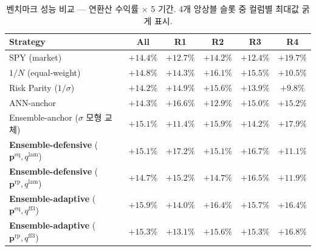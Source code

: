 \documentclass{article}
\begin{document}
\begin{table}[ht]
\centering
\caption{벤치마크 성능 비교 — 연환산 수익률 $\times$ 5 기간. 4개 앙상블 슬롯 중 컬럼별 최대값 굵게 표시.}
\label{tab:benchmark_annret}
\setlength{\tabcolsep}{6pt}
\renewcommand{\arraystretch}{1.15}
\small
\begin{tabular}{lccccc}
\toprule
Strategy & All & R1 & R2 & R3 & R4 \\
\midrule
SPY (market)                       & $+14.4\%$ & $+12.7\%$ & $+14.2\%$ & $+12.4\%$ & $+19.7\%$ \\
$1/N$ (equal-weight)               & $+14.8\%$ & $+14.3\%$ & $+16.1\%$ & $+15.5\%$ & $+10.5\%$ \\
Risk Parity ($1/\sigma$)           & $+14.2\%$ & $+14.9\%$ & $+15.6\%$ & $+13.9\%$ & $+9.8\%$  \\
ANN-anchor \citep{pyo2018}         & $+14.3\%$ & $+16.6\%$ & $+12.9\%$ & $+15.0\%$ & $+15.2\%$ \\
Ensemble-anchor ($\sigma$ 모형 교체) & $+15.1\%$ & $+11.4\%$ & $+15.9\%$ & $+14.2\%$ & $+17.9\%$ \\
\midrule
\textbf{Ensemble-defensive} ($\mathbf{p}^{\mathrm{eq}}, q^{\mathrm{lam}}$) & $+15.1\%$          & $\mathbf{+17.2\%}$ & $+15.1\%$          & $\mathbf{+16.7\%}$ & $+11.1\%$ \\
\textbf{Ensemble-defensive} ($\mathbf{p}^{\mathrm{rp}}, q^{\mathrm{lam}}$) & $+14.7\%$          & $+15.2\%$          & $+14.7\%$          & $+16.5\%$          & $+11.9\%$ \\
\textbf{Ensemble-adaptive}  ($\mathbf{p}^{\mathrm{eq}}, q^{\mathrm{ff3}}$) & $\mathbf{+15.9\%}$ & $+14.0\%$          & $\mathbf{+16.4\%}$ & $+15.7\%$          & $+16.4\%$ \\
\textbf{Ensemble-adaptive}  ($\mathbf{p}^{\mathrm{rp}}, q^{\mathrm{ff3}}$) & $+15.3\%$          & $+13.1\%$          & $+15.6\%$          & $+15.3\%$          & $\mathbf{+16.8\%}$ \\
\bottomrule
\end{tabular}
\end{table}
\end{document}
